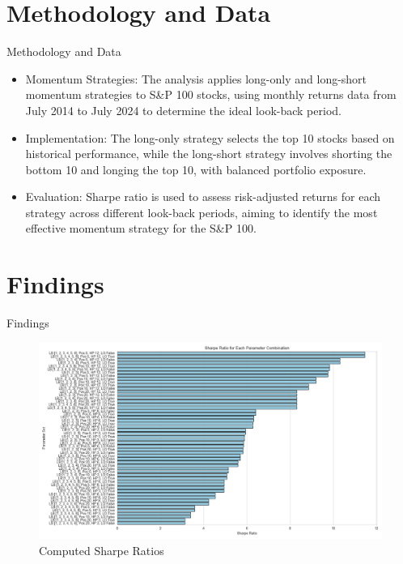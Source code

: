 \documentclass{beamer}
\begin{document}
\section{Methodology and Data}
\begin{frame}{Methodology and Data}
\begin{itemize}
        \item Momentum Strategies: The analysis applies long-only and long-short momentum strategies to S\&P 100 stocks, using monthly returns data from July 2014 to July 2024 to determine the ideal look-back period.
        \item Implementation: The long-only strategy selects the top 10 stocks based on historical performance, while the long-short strategy involves shorting the bottom 10 and longing the top 10, with balanced portfolio exposure.
        \item Evaluation: Sharpe ratio is used to assess risk-adjusted returns for each strategy across different look-back periods, aiming to identify the most effective momentum strategy for the S\&P 100.
    \end{itemize}
\end{frame}

\section{Findings}
\begin{frame}{Findings}
\begin{figure}
    \centering
    \includegraphics[width=1\linewidth]{Graphics/sharpe_ratios.png}
    \caption{Computed Sharpe Ratios}
    \label{fig:enter-label}
\end{figure}
\end{frame}
\end{document}
